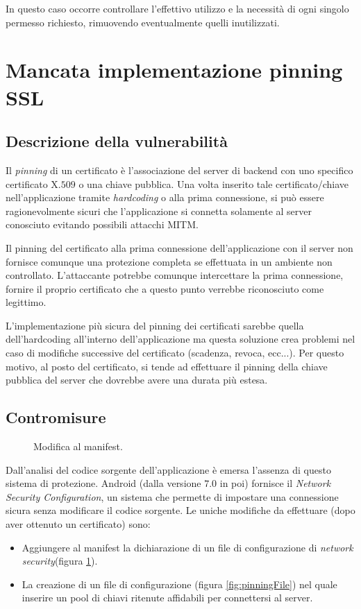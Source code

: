 In questo caso occorre controllare l'effettivo utilizzo e la necessità di ogni singolo permesso richiesto, rimuovendo eventualmente quelli inutilizzati.

\section{Mancata implementazione pinning SSL}

\subsection{Descrizione della vulnerabilità}
Il \emph{pinning} di un certificato è l'associazione del server di backend con uno specifico certificato X.$509$ o una chiave pubblica. Una volta inserito tale certificato/chiave nell'applicazione tramite \emph{hardcoding} o alla prima connessione, si può essere ragionevolmente sicuri che l'applicazione si connetta solamente al server conosciuto evitando possibili attacchi \ac{MITM}.

Il pinning del certificato alla prima connessione dell'applicazione con il server non fornisce comunque una protezione completa se effettuata in un ambiente non controllato. L'attaccante potrebbe comunque intercettare la prima connessione, fornire il proprio certificato che a questo punto verrebbe riconosciuto come legittimo. 

L'implementazione più sicura del pinning dei certificati sarebbe quella dell'hardcoding all'interno dell'applicazione ma questa soluzione crea problemi nel caso di modifiche successive del certificato (scadenza, revoca, ecc...). Per questo motivo, al posto del certificato, si tende ad effettuare il pinning della chiave pubblica del server che dovrebbe avere una durata più estesa.

\subsection{Contromisure}

\begin{figure}[h]
	\centering 
	\caption{Modifica al manifest.}
	\label{fig:pinningManifest}
\end{figure}

Dall'analisi del codice sorgente dell'applicazione è emersa l'assenza di questo sistema di protezione. Android (dalla versione $7.0$ in poi) fornisce il \emph{Network Security Configuration}, un sistema che permette di impostare una connessione sicura senza modificare il codice sorgente. Le uniche modifiche da effettuare (dopo aver ottenuto un certificato) sono: 
	\begin{itemize}
		\item Aggiungere al manifest la dichiarazione di un file di configurazione di \emph{network security}(figura \ref{fig:pinningManifest}).
		\item La creazione di un file di configurazione (figura \ref{fig:pinningFile}) nel quale inserire un pool di chiavi ritenute affidabili per connettersi al server.
	\end{itemize}

